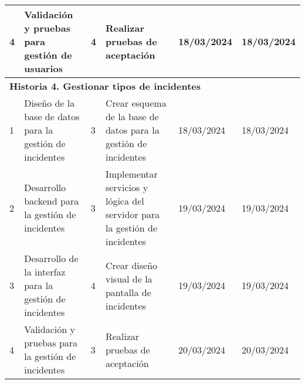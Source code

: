 \begin{longtable}{|p{0.5cm}|p{2cm}|p{1cm}|p{3cm}|p{1cm}|p{1cm}|}
    4                                        & Validación y pruebas para gestión de usuarios            & 4                                                              & Realizar pruebas de aceptación                                                 & 18/03/2024                                                    & 18/03/2024                                                          \\ \hline
    \multicolumn{6}{|l|}{\textbf{Historia 4. Gestionar tipos de incidentes}}                                                                                                                                                                                                                                                                                                                    \\ \hline
    1                                        & Diseño de la base de datos para la gestión de incidentes & 3                                                              & Crear esquema de la base de datos para la gestión de incidentes                & 18/03/2024                                                    & 18/03/2024                                                          \\ \hline
    2                                        & Desarrollo backend para la gestión de incidentes         & 3                                                              & Implementar servicios y lógica del servidor para la gestión de incidentes      & 19/03/2024                                                    & 19/03/2024                                                          \\ \hline
    3                                        & Desarrollo de la interfaz para la gestión de incidentes  & 4                                                              & Crear diseño visual de la pantalla de incidentes                               & 19/03/2024                                                    & 19/03/2024                                                          \\ \hline
    4                                        & Validación y pruebas para la gestión de incidentes       & 3                                                              & Realizar pruebas de aceptación                                                 & 20/03/2024                                                    & 20/03/2024                                                          \\ \hline
\end{longtable}